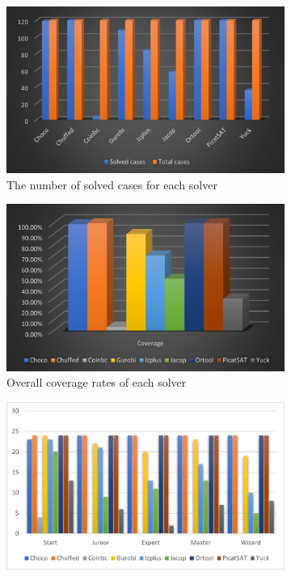 \begin{figure}[htbp]
    \centering
    \begin{subfigure}[b]{0.48\textwidth}
    \centering
    \includegraphics[width=\textwidth]{figs/solvedcases.png}
    \caption{The number of solved cases for each solver}
    \label{eva1}
    \end{subfigure}
     \begin{subfigure}[b]{0.48\textwidth}
     \centering
    \includegraphics[width=\textwidth]{figs/coverage.png}
    \caption{Overall coverage rates of each solver}
    \label{eva2}
    \end{subfigure}
     \begin{subfigure}[b]{0.48\textwidth}
    \includegraphics[width=\textwidth]{figs/separated number.png}

\end{subfigure}
\end{figure}

